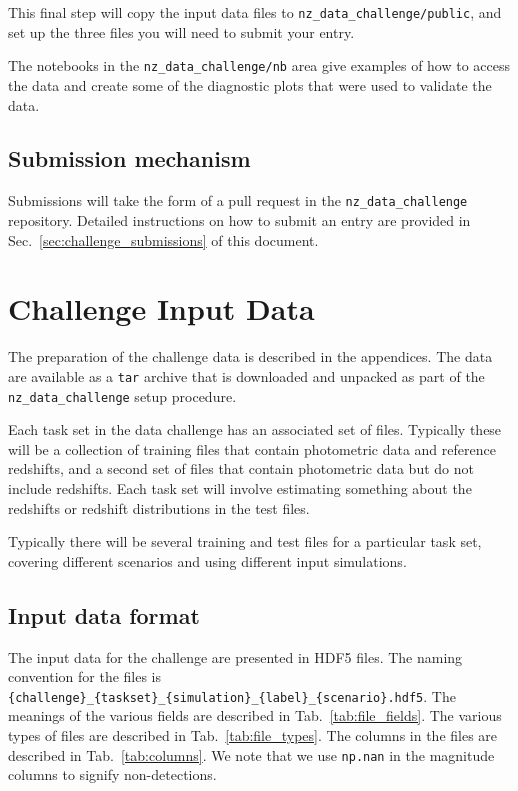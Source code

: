 \documentclass[11pt,twoside,letterpaper,onecolumn,english]{article}
\begin{document}
This final step will copy the input data files to
\texttt{nz\_data\_challenge/public}, and set up the three files you will
need to submit your entry.

The notebooks in the \texttt{nz\_data\_challenge/nb} area give examples
of how to access the data and create some of the diagnostic plots
that were used to validate the data.


\subsection{Submission mechanism}

Submissions will take the form of a pull request in the
\texttt{nz\_data\_challenge} repository.  Detailed instructions on how
to submit an entry are provided in
Sec.~\ref{sec:challenge_submissions} of this document.


\section{Challenge Input Data}
\label{sec:challenge_input_data}

The preparation of the challenge data is described in the appendices.
The data are available as a \texttt{tar} archive that is downloaded and
unpacked as part of the \texttt{nz\_data\_challenge} setup procedure.

Each task set in the data challenge has an associated set of files.
Typically these will be a collection of training files that contain
photometric data and reference redshifts, and a second set of files
that contain photometric data but do not include redshifts. Each
task set will involve estimating something about the redshifts or
redshift distributions in the test files.

Typically there will be several training and test files for a
particular task set, covering different scenarios and using different
input simulations.


\subsection{Input data format}

The input data for the challenge are presented in HDF5 files.
The naming convention for the files is
\texttt{\{challenge\}\_\{taskset\}\_\{simulation\}\_\{label\}\_\{scenario\}.hdf5}.
The meanings of the various \allowbreak fields are described in
Tab.~\ref{tab:file_fields}.   The various types of files are described in
Tab.~\ref{tab:file_types}. The columns in the files are described
in Tab.~\ref{tab:columns}.  We note that we use \texttt{np.nan} in
the magnitude columns to signify non-detections.
\end{document}
